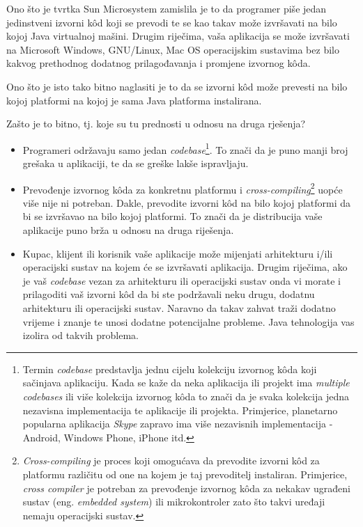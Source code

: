 Ono što je tvrtka Sun Microsystem zamislila je to da programer piše jedan jedinstveni izvorni kôd koji se prevodi te se kao takav može izvršavati na bilo kojoj Java virtualnoj mašini. Drugim riječima, vaša aplikacija se može izvršavati na Microsoft Windows, GNU/Linux, Mac OS operacijskim sustavima bez bilo kakvog prethodnog dodatnog prilagođavanja i promjene izvornog kôda.

Ono što je isto tako bitno naglasiti je to da se izvorni kôd može prevesti na bilo kojoj platformi na kojoj je sama Java platforma instalirana.

Zašto je to bitno, tj. koje su tu prednosti u odnosu na druga rješenja?

\begin{itemize}
    \item Programeri održavaju samo jedan \emph{codebase}\footnote{Termin \emph{codebase} predstavlja jednu cijelu kolekciju izvornog kôda koji sačinjava aplikaciju. Kada se kaže da neka aplikacija ili projekt ima \emph{multiple codebases} ili više kolekcija izvornog kôda to znači da je svaka kolekcija jedna nezavisna implementacija te aplikacije ili projekta. Primjerice, planetarno popularna aplikacija \emph{Skype} zapravo ima više nezavisnih implementacija - Android, Windows Phone, iPhone itd.}. To znači da je puno manji broj grešaka u aplikaciji, te da se greške lakše ispravljaju.
    
    \item Prevođenje izvornog kôda za konkretnu platformu i \emph{cross-compiling}\footnote{\emph{Cross-compiling} je proces koji omogućava da prevodite izvorni kôd za platformu različitu od one na kojem je taj prevoditelj instaliran. Primjerice, \emph{cross compiler} je potreban za prevođenje izvornog kôda za nekakav ugrađeni sustav (eng. \emph{embedded system}) ili mikrokontroler zato što takvi uređaji nemaju operacijski sustav.} uopće više nije ni potreban. Dakle, prevodite izvorni kôd na bilo kojoj platformi da bi se izvršavao na bilo kojoj platformi. To znači da je distribucija vaše aplikacije puno brža u odnosu na druga riješenja.
    
    \item Kupac, klijent ili korisnik vaše aplikacije može mijenjati arhitekturu i/ili operacijski sustav na kojem će se izvršavati aplikacija. Drugim riječima, ako je vaš \emph{codebase} vezan za arhitekturu ili operacijski sustav onda vi morate i prilagoditi vaš izvorni kôd da bi ste podržavali neku drugu, dodatnu arhitekturu ili operacijski sustav. Naravno da takav zahvat traži dodatno vrijeme i znanje te unosi dodatne potencijalne probleme. Java tehnologija vas izolira od takvih problema.
\end{itemize}

